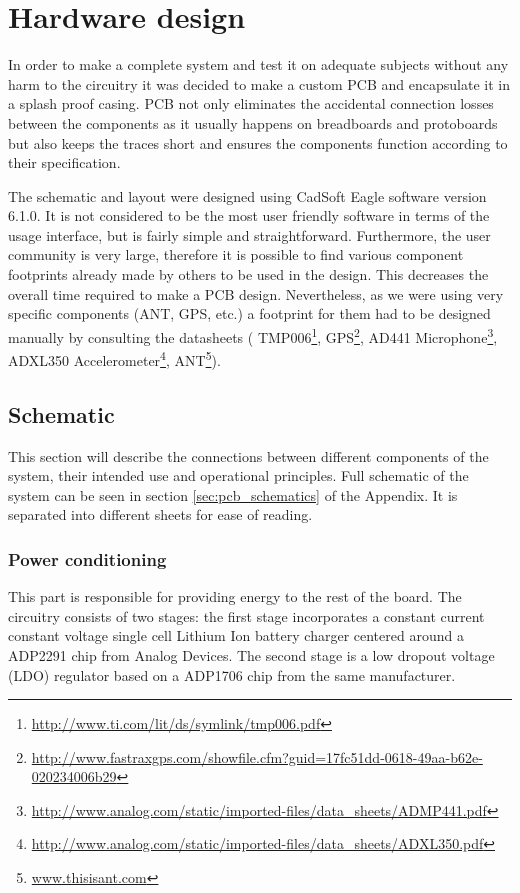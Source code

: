\chapter{Hardware design}
In order to make a complete system and test it on adequate subjects without any harm to the circuitry it was decided to make a custom PCB and encapsulate it in a splash proof casing. PCB not only eliminates the accidental connection losses between the components as it usually happens on breadboards and protoboards but also keeps the traces short and ensures the components function according to their specification.
 
The schematic and layout were designed using CadSoft Eagle software version 6.1.0. It is not considered to be the most user friendly software in terms of the usage interface, but is fairly simple and straightforward. Furthermore, the user community is very large, therefore it is possible to find various component footprints already made by others to be used in the design. This decreases the overall time required to make a PCB design. Nevertheless, as we were using very specific components  (ANT, GPS, etc.) a footprint for them had to be designed manually by consulting the datasheets ( TMP006\footnote{\url{http://www.ti.com/lit/ds/symlink/tmp006.pdf}}, GPS\footnote{\url{http://www.fastraxgps.com/showfile.cfm?guid=17fc51dd-0618-49aa-b62e-020234006b29}},
AD441 Microphone\footnote{\url{http://www.analog.com/static/imported-files/data_sheets/ADMP441.pdf}},
ADXL350 Accelerometer\footnote{\url{http://www.analog.com/static/imported-files/data_sheets/ADXL350.pdf}},
ANT\footnote{\href{http://www.thisisant.com/assets/resources/Datasheets/D00001266_AP2_RF_Transceiver_Module_Datasheet_Rev1.8.pdf}{www.thisisant.com}}).


\section{Schematic}
This section will describe the connections between different components of the system, their intended use and operational principles. Full schematic of the system can be seen in section \ref{sec:pcb_schematics} of the Appendix. It is separated into different sheets for ease of reading.

\subsection{Power conditioning}
This part is responsible for providing energy to the rest of the board. The circuitry consists of two stages: the first stage incorporates a constant current constant voltage single cell Lithium Ion battery charger centered around a ADP2291 chip from Analog Devices. The second stage is a low dropout voltage (LDO) regulator based on a ADP1706 chip from the same manufacturer.



